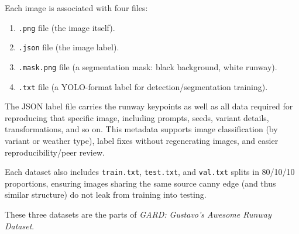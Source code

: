 Each image is associated with four files:
\begin{enumerate}
\item \texttt{.png} file (the image itself).
\item \texttt{.json} file (the image label).
\item \texttt{.mask.png} file (a segmentation mask: black background, white runway).
\item \texttt{.txt} file (a YOLO-format label for detection/segmentation training).
\end{enumerate}

The JSON label file carries the runway keypoints as well as all data required for reproducing that specific image, including prompts, seeds, variant details, transformations, and so on. 
This metadata supports image classification (by variant or weather type), label fixes without regenerating images, and easier reproducibility/peer review.

Each dataset also includes \texttt{train.txt}, \texttt{test.txt}, and \texttt{val.txt} splits in 80/10/10 proportions, ensuring images sharing the same source canny edge (and thus similar structure) do not leak from training into testing.

These three datasets are the parts of \emph{GARD: Gustavo’s Awesome Runway Dataset}.
